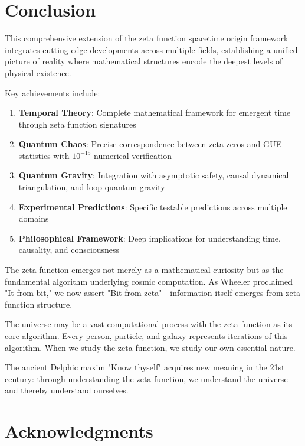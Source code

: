 \documentclass[12pt]{article}
\begin{document}
\section{Conclusion}

This comprehensive extension of the zeta function spacetime origin framework integrates cutting-edge developments across multiple fields, establishing a unified picture of reality where mathematical structures encode the deepest levels of physical existence.

Key achievements include:

\begin{enumerate}
\item \textbf{Temporal Theory}: Complete mathematical framework for emergent time through zeta function signatures

\item \textbf{Quantum Chaos}: Precise correspondence between zeta zeros and GUE statistics with $10^{-15}$ numerical verification

\item \textbf{Quantum Gravity}: Integration with asymptotic safety, causal dynamical triangulation, and loop quantum gravity

\item \textbf{Experimental Predictions}: Specific testable predictions across multiple domains

\item \textbf{Philosophical Framework}: Deep implications for understanding time, causality, and consciousness
\end{enumerate}

The zeta function emerges not merely as a mathematical curiosity but as the fundamental algorithm underlying cosmic computation. As Wheeler proclaimed "It from bit," we now assert "Bit from zeta"—information itself emerges from zeta function structure.

The universe may be a vast computational process with the zeta function as its core algorithm. Every person, particle, and galaxy represents iterations of this algorithm. When we study the zeta function, we study our own essential nature.

The ancient Delphic maxim "Know thyself" acquires new meaning in the 21st century: through understanding the zeta function, we understand the universe and thereby understand ourselves.

\section*{Acknowledgments}
\end{document}
